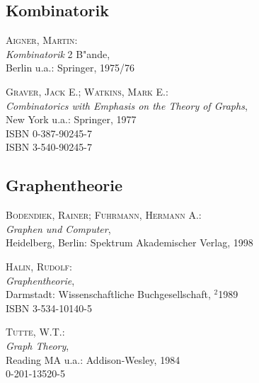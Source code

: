 \subsection{Kombinatorik}

\begin{description}
  

\item \textsc{Aigner, Martin}: \\
  \textit{Kombinatorik} 2 B"ande, \\
  Berlin u.a.: Springer, 1975/76
  

\item \textsc{Graver, Jack E.; Watkins, Mark E.}: \\
  \textit{Combinatorics with Emphasis on the Theory of Graphs}, \\
  New York u.a.: Springer, 1977 \\
  ISBN 0-387-90245-7 \\
  ISBN 3-540-90245-7

\end{description}


\subsection{Graphentheorie}

\begin{description}
  

\item \textsc{Bodendiek, Rainer; Fuhrmann, Hermann A.}: \\
  \textit{Graphen und Computer}, \\
  Heidelberg, Berlin: Spektrum Akademischer Verlag, 1998
  

\item \textsc{Halin, Rudolf}: \\
  \textit{Graphentheorie}, \\
  Darmstadt: Wissenschaftliche Buchgesellschaft, $^2$1989 \\
  ISBN 3-534-10140-5
  

\item \textsc{Tutte, W.T.}: \\
  \textit{Graph Theory}, \\
  Reading MA u.a.: Addison-Wesley, 1984 \\
  0-201-13520-5

\end{description}


